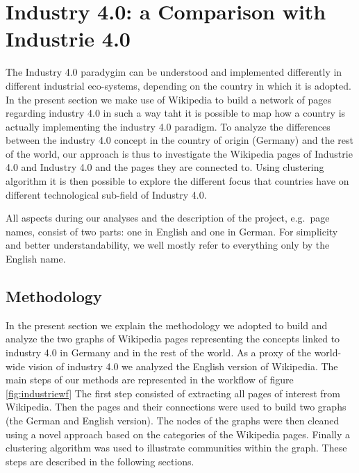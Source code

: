 \documentclass[]{book}
\begin{document}
\section{Industry 4.0: a Comparison with Industrie
4.0}\label{industry-4.0-a-comparison-with-industrie-4.0}

The Industry 4.0 paradygim can be understood and implemented differently
in different industrial eco-systems, depending on the country in which
it is adopted. In the present section we make use of Wikipedia to build
a network of pages regarding industry 4.0 in such a way taht it is
possible to map how a country is actually implementing the industry 4.0
paradigm. To analyze the differences between the industry 4.0 concept in
the country of origin (Germany) and the rest of the world, our approach
is thus to investigate the Wikipedia pages of Industrie 4.0 and Industry
4.0 and the pages they are connected to. Using clustering algorithm it
is then possible to explore the different focus that countries have on
different technological sub-field of Industry 4.0.

All aspects during our analyses and the description of the project,
e.g.~page names, consist of two parts: one in English and one in German.
For simplicity and better understandability, we well mostly refer to
everything only by the English name.

\subsection{Methodology}\label{methodology-7}

In the present section we explain the methodology we adopted to build
and analyze the two graphs of Wikipedia pages representing the concepts
linked to industry 4.0 in Germany and in the rest of the world. As a
proxy of the world-wide vision of industry 4.0 we analyzed the English
version of Wikipedia. The main steps of our methods are represented in
the workflow of figure \ref{fig:industriewf} The first step consisted of
extracting all pages of interest from Wikipedia. Then the pages and
their connections were used to build two graphs (the German and English
version). The nodes of the graphs were then cleaned using a novel
approach based on the categories of the Wikipedia pages. Finally a
clustering algorithm was used to illustrate communities within the
graph. These steps are described in the following sections.
\end{document}
